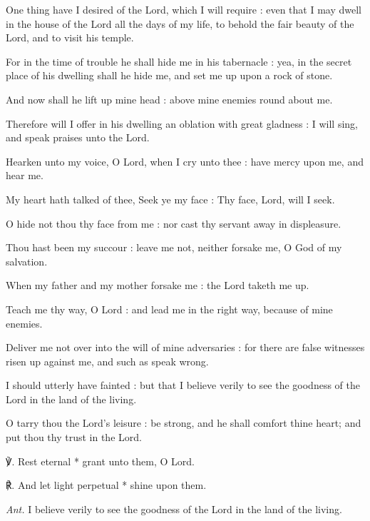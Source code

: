 One thing have I desired of the Lord, which I will require : even that I may dwell in the house of the Lord all the days of my life, to behold the fair beauty of the Lord, and to visit his temple.\par
{}For in the time of trouble he shall hide me in his tabernacle : yea, in the secret place of his dwelling shall he hide me, and set me up upon a rock of stone.\par
{}And now shall he lift up mine head : above mine enemies round about me.\par
{}Therefore will I offer in his dwelling an oblation with great gladness : I will sing, and speak praises unto the Lord.\par
{}Hearken unto my voice, O Lord, when I cry unto thee : have mercy upon me, and hear me.\par
{}My heart hath talked of thee, Seek ye my face : Thy face, Lord, will I seek.\par
{}O hide not thou thy face from me : nor cast thy servant away in displeasure.\par
{}Thou hast been my succour : leave me not, neither forsake me, O God of my salvation.\par
{}When my father and my mother forsake me : the Lord taketh me up.\par
{}Teach me thy way, O Lord : and lead me in the right way, because of mine enemies.\par
{}Deliver me not over into the will of mine adversaries : for there are false witnesses risen up against me, and such as speak wrong.\par
{}I should utterly have fainted : but that I believe verily to see the goodness of the Lord in the land of the living.\par
{}O tarry thou the Lord's leisure : be strong, and he shall comfort thine heart; and put thou thy trust in the Lord.\par
℣. Rest eternal * grant unto them, O Lord.\par
℟. And let light perpetual * shine upon them.\par\noindent
\textit{Ant.} I believe verily to see the goodness of the Lord in the land of the living.\par
